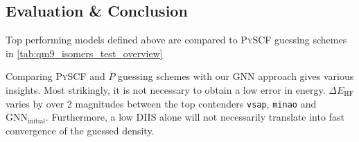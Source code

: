 \subsection{Evaluation \& Conclusion}
\label{subsec:qm9_isomers_eval_and_concl}
Top performing models defined above are compared to \textsc{PySCF} guessing schemes in \autoref{tab:qm9_isomers_test_overview}
\begin{table}[H]
    \centering
    \caption{Comparison of different models with \textsc{PySCF} and $\overline{P}$ guessing schemes.}
    \label{tab:qm9_isomers_test_overview}
\end{table}
Comparing \textsc{PySCF} and $\overline{P}$ guessing schemes with our GNN approach gives various insights. Most strikingly, it is not necessary to obtain a low error in energy. $\Delta E_\text{HF}$ varies by over 2 magnitudes between the top contenders \texttt{vsap}, \texttt{minao} and $\text{GNN}_\text{initial}$. Furthermore, a low DIIS alone will not necessarily translate into fast convergence of the guessed density. \\

